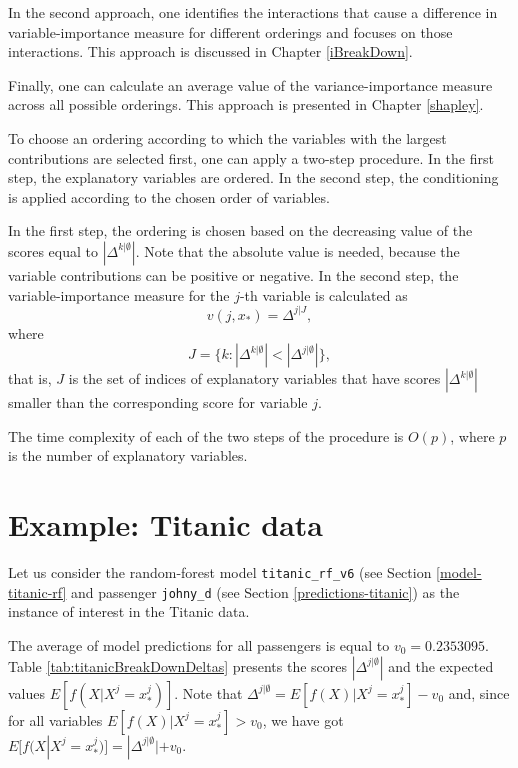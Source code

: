 \documentclass[]{krantz}
\begin{document}
In the second approach, one identifies the interactions that cause a difference in variable-importance measure for different orderings and focuses on those interactions. This approach is discussed in Chapter \ref{iBreakDown}.

Finally, one can calculate an average value of the variance-importance measure across all possible orderings. This approach is presented in Chapter \ref{shapley}.

To choose an ordering according to which the variables with the largest contributions are selected first, one can apply a two-step procedure. In the first step, the explanatory variables are ordered. In the second step, the conditioning is applied according to the chosen order of variables.

In the first step, the ordering is chosen based on the decreasing value of the scores equal to \(|\Delta^{k|\emptyset}|\). Note that the absolute value is needed, because the variable contributions can be positive or negative. In the second step, the variable-importance measure for the \(j\)-th variable is calculated as
\[
v(j, x_*) = \Delta ^{j|J},
\]
where
\[
J = \{k: |\Delta^{k|\emptyset}| < |\Delta^{j|\emptyset}|\},
\]
that is, \(J\) is the set of indices of explanatory variables that have scores \(|\Delta^{k|\emptyset}|\) smaller than the corresponding score for variable \(j\).

The time complexity of each of the two steps of the procedure is \(O(p)\), where \(p\) is the number of explanatory variables.

\hypertarget{BDExample}{%
\section{Example: Titanic data}\label{BDExample}}

Let us consider the random-forest model \texttt{titanic\_rf\_v6} (see Section \ref{model-titanic-rf} and passenger \texttt{johny\_d} (see Section \ref{predictions-titanic}) as the instance of interest in the Titanic data.

The average of model predictions for all passengers is equal to \(v_0 = 0.2353095\). Table \ref{tab:titanicBreakDownDeltas} presents the scores \(|\Delta^{j|\emptyset}|\) and the expected values \(E[f(X | X^j = x^j_*)]\). Note that \(\Delta^{j|\emptyset}=E[f(X) | X^j = x^j_*]-v_0\) and, since for all variables \(E[f(X) | X^j = x^j_*]>v_0\), we have got \(E[f(X | X^j = x^j_*)]=|\Delta^{j|\emptyset}|+v_0\).
\end{document}
